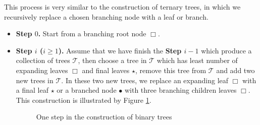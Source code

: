 This process is very similar to the construction of ternary trees, in which we recursively replace a chosen branching node with a leaf or branch.

\begin{itemize}
 \item \textbf{Step $0$.} Start from a branching root node $\Box$.
 
 \item \textbf{Step $i$ ($i\ge 1$).} Assume that we have finish the \textbf{Step $i-1$} which produce a collection of trees $\mathscr{T}$, then choose a tree in $\mathscr{T}$ which has least number of expanding leaves $\Box$ and final leaves $\star$, remove this tree from $\mathscr{T}$ and add two new trees in $\mathscr{T}$. In these two new trees, we replace an expanding leaf $\Box$ with a final leaf $\star$ or a branched node $\bullet$ with three branching children leaves $\Box$. This construction is illustrated by Figure \ref{fig.construction}.
 \begin{figure}[H]
 \centering
 \caption{One step in the construction of binary trees}
 \label{fig.construction}
 \end{figure}
 


\end{itemize}
